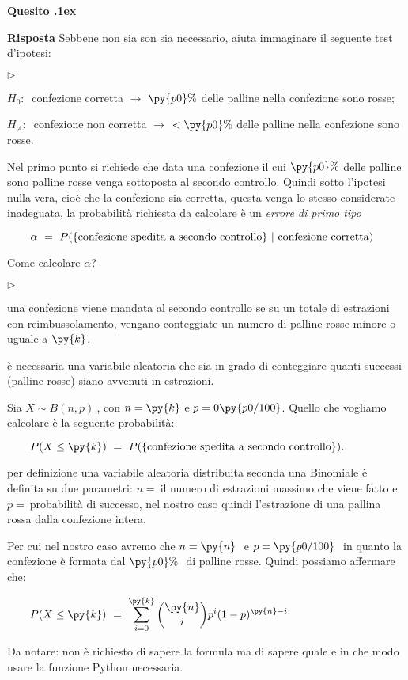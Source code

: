 \documentclass[11pt,twoside,a4paper]{article}
\newcommand{\mylabel}[1]{#1\hfill}
\renewenvironment{itemize}
  {\begin{list}{$\triangleright$}{%
   \setlength{\parskip}{0mm}
   \setlength{\topsep}{.4\baselineskip}
   \setlength{\rightmargin}{0mm}
   \setlength{\listparindent}{0mm}
   \setlength{\itemindent}{0mm}
   \setlength{\labelwidth}{2ex}
   \setlength{\itemsep}{.4\baselineskip}
   \setlength{\parsep}{0mm}
   \setlength{\partopsep}{0mm}
   \setlength{\labelsep}{1ex}
   \setlength{\leftmargin}{\labelwidth+\labelsep}
   \let\makelabel\mylabel}}{%
   \end{list}\vspace*{-1.3mm}}
\newcounter{quesito}
\newenvironment{question}{\addtocounter{quesito}{1}\par\textbf{Quesito \thequesito.\kern1ex}}{\vspace{0.5\parskip}}
\newenvironment{answer}{\par\textbf{Risposta\quad}}{\vspace{\parskip}}
\begin{document}
\begin{question}
\begin{answer}
Sebbene non sia son sia necessario, aiuta immaginare il seguente test d'ipotesi:
\begin{itemize}
\item $H_0:\ $ confezione corretta $\rightarrow$ $\py{p0}\%$ delle palline nella confezione sono rosse;
\item $H_A:\ $ confezione non corretta $\rightarrow$ $< \py{p0}\%$ delle palline nella confezione sono rosse.
\end{itemize} 
Nel primo punto si richiede che data una confezione il cui $\py{p0} \% $ delle palline sono palline rosse  venga sottoposta al secondo controllo. Quindi sotto l'ipotesi nulla vera, cioè che la confezione sia corretta, questa venga lo stesso considerate inadeguata, la probabilità richiesta da calcolare è un \textit{errore di primo tipo}

$\qquad
\alpha\ =\ P(\{{\rm confezione\ spedita\ a\ secondo\ controllo}\}\ | {\rm\ confezione\ corretta})
$

Come calcolare $\alpha$? 
\begin{itemize}
\item una confezione viene mandata al secondo controllo se su un totale di  estrazioni con reimbussolamento, vengano conteggiate un numero di palline rosse minore o uguale a $\py{k}$.
\item è necessaria una variabile aleatoria che sia in grado di conteggiare quanti successi (palline rosse) siano avvenuti in  estrazioni.
\item Sia $X\sim B(n,p)\ $, con $n=\py{k}$ e $p=0\py{p0/100}$. Quello che vogliamo calcolare è la seguente probabilità:

$\qquad
P(X\le \py{k})\ =\ P(\{\rm confezione\ spedita\ a\ secondo\ controllo\}).
$

\item per definizione una variabile aleatoria distribuita seconda una Binomiale è definita su due parametri: $n=\ $il numero di estrazioni massimo che viene fatto e $p=\ $probabilità di successo, nel nostro caso quindi l'estrazione di una pallina rossa dalla confezione intera. 
\end{itemize}
Per cui nel nostro caso avremo che $n=\py{n}\ $ e $p=\py{p0/100}\ $ in quanto la confezione è formata dal $\py{p0}\%\ $ di palline rosse. Quindi possiamo affermare che:

$\qquad\displaystyle
P(X\le \py{k})\ =\  \sum_{i=0}^{\py{k}}\binom{\py{n}}{i} p^i (1-p)^{\py{n}-i} 
$

Da notare: non è richiesto di sapere la formula ma di sapere quale e in che modo usare la funzione Python necessaria.


\end{answer}
\end{question}
\end{document}

